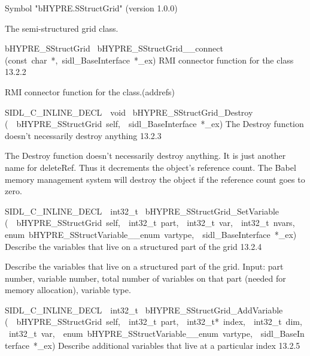 \documentclass{article}
\begin{document}
\begin{cxxentry}
\begin{cxxentry}
\begin{cxxvariable}
\begin{cxxdoc}
Symbol "bHYPRE.SStructGrid" (version 1.0.0)

The semi-structured grid class.
\end{cxxdoc}
\end{cxxvariable}
\begin{cxxfunction}
{bHYPRE\_SStructGrid\ }
        {bHYPRE\_SStructGrid\_\_connect}
        {(const\ char\ *,\ sidl\_BaseInterface\ *\_ex)}
        {
RMI connector function for the class}
        {13.2.2}
\begin{cxxdoc}

RMI connector function for the class.(addrefs)
\end{cxxdoc}
\end{cxxfunction}
\begin{cxxfunction}
{SIDL\_C\_INLINE\_DECL\ \ void\ }
        {bHYPRE\_SStructGrid\_Destroy}
        {(\ \ bHYPRE\_SStructGrid\ self,\ \ sidl\_BaseInterface\ *\_ex)}
        {
The Destroy function doesn't necessarily destroy anything}
        {13.2.3}
\begin{cxxdoc}

The Destroy function doesn't necessarily destroy anything.
It is just another name for deleteRef.  Thus it decrements the
object's reference count.  The Babel memory management system will
destroy the object if the reference count goes to zero.
\end{cxxdoc}
\end{cxxfunction}
\begin{cxxfunction}
{SIDL\_C\_INLINE\_DECL\ \ int32\_t\ }
        {bHYPRE\_SStructGrid\_SetVariable}
        {(\ \ bHYPRE\_SStructGrid\ self,\ \ int32\_t\ part,\ \ int32\_t\ var,\ \ int32\_t\ nvars,\ \ enum\ bHYPRE\_SStructVariable\_\_enum\ vartype,\ \ sidl\_BaseInterface\ *\_ex)}
        {
Describe the variables that live on a structured part of the
grid}
        {13.2.4}
\begin{cxxdoc}

Describe the variables that live on a structured part of the
grid.  Input: part number, variable number, total number of
variables on that part (needed for memory allocation),
variable type.
\end{cxxdoc}
\end{cxxfunction}
\begin{cxxfunction}
{SIDL\_C\_INLINE\_DECL\ \ int32\_t\ }
        {bHYPRE\_SStructGrid\_AddVariable}
        {(\ \ bHYPRE\_SStructGrid\ self,\ \ int32\_t\ part,\ \ int32\_t*\ index,\ \ int32\_t\ dim,\ \ int32\_t\ var,\ \ enum\ bHYPRE\_SStructVariable\_\_enum\ vartype,\ \ sidl\_BaseInterface\ *\_ex)}
        {
Describe additional variables that live at a particular
index}
        {13.2.5}
\begin{cxxdoc}


\end{cxxdoc}
\end{cxxfunction}
\end{cxxentry}
\end{cxxentry}
\end{document}
